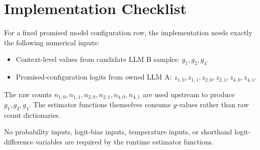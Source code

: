 \documentclass[11pt]{article}
\begin{document}
\section{Implementation Checklist}

For a fixed promised model configuration row, the implementation needs exactly the following numerical inputs:

\begin{itemize}[leftmargin=*]
    \item Context-level values from candidate LLM B samples: \(g_1,g_2,g_4\).
    \item Promised-configuration logits from owned LLM A: \(z_{1,0}, z_{1,1}, z_{2,0}, z_{2,1}, z_{4,0}, z_{4,1}\).
\end{itemize}

The raw counts \(n_{1,0}, n_{1,1}, n_{2,0}, n_{2,1}, n_{4,0}, n_{4,1}\) are used upstream to produce \(g_1,g_2,g_4\). The estimator functions themselves consume \(g\)-values rather than raw count dictionaries.

No probability inputs, logit-bias inputs, temperature inputs, or shorthand logit-difference variables are required by the runtime estimator functions.
\end{document}

